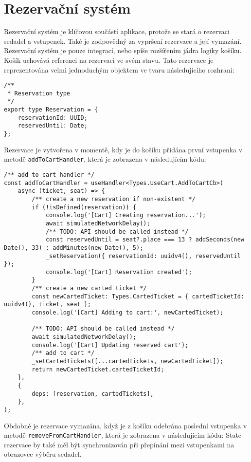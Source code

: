 \section{Rezervační systém}
\label{sec:implementace-rezervace}
Rezervační systém je klíčovou součástí aplikace, protože se stará o rezervaci sedadel a vstupenek.
Také je zodpovědný za vypršení rezervace a její vymazání.
Rezervační systém je pouze integrací, nebo spíše rozšířením jádra logiky košíku.
Košík uchovává referenci na rezervaci ve svém stavu.
Tato rezervace je reprezentována velmi jednoduchým objektem ve tvaru následujícího rozhraní:

\begin{verbatim}
/**
 * Reservation type
 */
export type Reservation = {
	reservationId: UUID;
	reservedUntil: Date;
};
\end{verbatim}

Rezervace je vytvořena v momentě, kdy je do košíku přidána první vstupenka v metodě \texttt{addToCartHandler}, která je zobrazena v následujícím kódu:

\begin{verbatim}
/** add to cart handler */
const addToCartHandler = useHandler<Types.UseCart.AddToCartCb>(
	async (ticket, seat) => {
		/** create a new reservation if non-existent */
		if (!isDefined(reservation)) {
			console.log('[Cart] Creating reservation...');
			await simulatedNetworkDelay();
			/** TODO: API should be called instead */
			const reservedUntil = seat?.place === 13 ? addSeconds(new Date(), 33) : addMinutes(new Date(), 5);
			_setReservation({ reservationId: uuidv4(), reservedUntil });
			console.log('[Cart] Reservation created');
		}
		/** create a new carted ticket */
		const newCartedTicket: Types.CartedTicket = { cartedTicketId: uuidv4(), ticket, seat };
		console.log('[Cart] Adding to cart:', newCartedTicket);

		/** TODO: API should be called instead */
		await simulatedNetworkDelay();
		console.log('[Cart] Updating reserved cart');
		/** add to cart */
		_setCartedTickets([...cartedTickets, newCartedTicket]);
		return newCartedTicket.cartedTicketId;
	},
	{
		deps: [reservation, cartedTickets],
	},
);
\end{verbatim}

Obdobně je rezervace vymazána, když je z košíku odebrána poslední vstupenka v metodě \texttt{removeFromCartHandler}, která je zobrazena v následujícím kódu:
State rezervace by také měl být synchronizován při přepínání mezi vstupenkami na obrazovce výběru sedadel.

